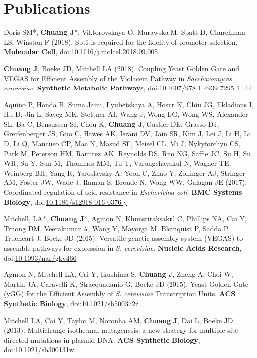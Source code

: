 \section*{Publications}
\begingroup
\singlespacing
\begin{description}[align=right, labelwidth=1.5cm, itemsep=1em, leftmargin=!]
    \item [2018] Doris SM*, \textbf{Chuang J}*, Viktorovskaya O, Murawska M, Spatt D, Churchman LS, Winston F (2018). Spt6 is required for the fidelity of promoter selection. \textbf{Molecular Cell}, doi:\href{https://doi.org/10.1016/j.molcel.2018.09.005}{10.1016/j.molcel.2018.09.005}
    \item [2018] \textbf{Chuang J}, Boeke JD, Mitchell LA (2018). Coupling Yeast Golden Gate and VEGAS for Efficient Assembly of the Violacein Pathway in \textit{Saccharomyces cerevisiae}. \textbf{Synthetic Metabolic Pathways}, doi:\href{https://doi.org/10.1007/978-1-4939-7295-1_14}{10.1007/978-1-4939-7295-1\_14}
    \item [2017] Aquino P, Honda B, Suma Jaini, Lyubetskaya A, Hosur K, Chiu JG, Ekladious I, Hu D, Jin L, Sayeg MK, Stettner AI, Wang J, Wong BG, Wong WS, Alexander SL, Ba C, Bensussen SI, Chou K, \textbf{Chuang J}, Gastler DE, Grasso DJ, Greifenberger JS, Guo C, Hawes AK, Israni DV, Jain SR, Kim J, Lei J, Li H, Li D, Li Q, Mancuso CP, Mao N, Masud SF, Meisel CL, Mi J, Nykyforchyn CS, Park M, Peterson HM, Ramirez AK, Reynolds DS, Rim NG, Saffie JC, Su H, Su WR, Su Y, Sun M, Thommes MM, Tu T, Varongchayakul N, Wagner TE, Weinberg BH, Yang R, Yaroslavsky A, Yoon C, Zhao Y, Zollinger AJ, Stringer AM, Foster JW, Wade J, Raman S, Broude N, Wong WW, Galagan JE (2017). Coordinated regulation of acid resistance in \textit{Escherichia coli}. \textbf{BMC Systems Biology}, doi:\href{https://doi.org/10.1186/s12918-016-0376-y}{10.1186/s12918-016-0376-y}
    \item [2015] Mitchell, LA*, \textbf{Chuang J}*, Agmon N, Khunsriraksakul C, Phillips NA, Cai Y, Truong DM, Veerakumar A, Wang Y, Mayorga M, Blomquist P, Sadda P, Trueheart J, Boeke JD (2015). Versatile genetic assembly system (VEGAS) to assemble pathways for expression in \textit{S. cerevisiae}. \textbf{Nucleic Acids Research}, doi:\href{https://doi.org/10.1093/nar/gkv466}{10.1093/nar/gkv466}
    \item [2015] Agmon N, Mitchell LA, Cai Y, Ikushima S, \textbf{Chuang J}, Zheng A, Choi W, Martin JA, Caravelli K, Stracquadanio G, Boeke JD (2015). Yeast Golden Gate (yGG) for the Efficient Assembly of \textit{S. cerevisiae} Transcription Units. \textbf{ACS Synthetic Biology}, doi:\href{https://doi.org/10.1021/sb500372z}{10.1021/sb500372z}
    \item [2013] Mitchell LA, Cai Y, Taylor M, Noronha AM, \textbf{Chuang J}, Dai L, Boeke JD (2013). Multichange isothermal mutagenesis: a new strategy for multiple site-directed mutations in plasmid DNA. \textbf{ACS Synthetic Biology}, \\doi:\href{https://doi.org/10.1021/sb300131w}{10.1021/sb300131w}
\end{description}
\endgroup

